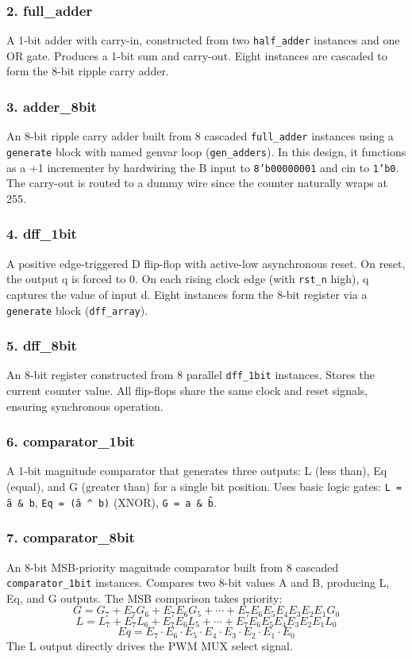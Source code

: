 \documentclass[12pt,a4paper]{article}
\begin{document}
\subsubsection*{2. full\_adder}
A 1-bit adder with carry-in, constructed from two \texttt{half\_adder} instances and one OR gate. Produces a 1-bit sum and carry-out. Eight instances are cascaded to form the 8-bit ripple carry adder.

\subsubsection*{3. adder\_8bit}
An 8-bit ripple carry adder built from 8 cascaded \texttt{full\_adder} instances using a \texttt{generate} block with named genvar loop (\texttt{gen\_adders}). In this design, it functions as a +1 incrementer by hardwiring the B input to \texttt{8'b00000001} and cin to \texttt{1'b0}. The carry-out is routed to a dummy wire since the counter naturally wraps at 255.

\subsubsection*{4. dff\_1bit}
A positive edge-triggered D flip-flop with active-low asynchronous reset. On reset, the output q is forced to 0. On each rising clock edge (with \texttt{rst\_n} high), q captures the value of input d. Eight instances form the 8-bit register via a \texttt{generate} block (\texttt{dff\_array}).

\subsubsection*{5. dff\_8bit}
An 8-bit register constructed from 8 parallel \texttt{dff\_1bit} instances. Stores the current counter value. All flip-flops share the same clock and reset signals, ensuring synchronous operation.

\subsubsection*{6. comparator\_1bit}
A 1-bit magnitude comparator that generates three outputs: L (less than), Eq (equal), and G (greater than) for a single bit position. Uses basic logic gates: \texttt{L = \~a \& b}, \texttt{Eq = \~(a \^{} b)} (XNOR), \texttt{G = a \& \~b}.

\subsubsection*{7. comparator\_8bit}
An 8-bit MSB-priority magnitude comparator built from 8 cascaded \texttt{comparator\_1bit} instances. Compares two 8-bit values A and B, producing L, Eq, and G outputs. The MSB comparison takes priority:
\[
G = G_7 + E_7 G_6 + E_7 E_6 G_5 + \cdots + E_7 E_6 E_5 E_4 E_3 E_2 E_1 G_0
\]
\[
L = L_7 + E_7 L_6 + E_7 E_6 L_5 + \cdots + E_7 E_6 E_5 E_4 E_3 E_2 E_1 L_0
\]
\[
Eq = E_7 \cdot E_6 \cdot E_5 \cdot E_4 \cdot E_3 \cdot E_2 \cdot E_1 \cdot E_0
\]
The L output directly drives the PWM MUX select signal.
\end{document}
